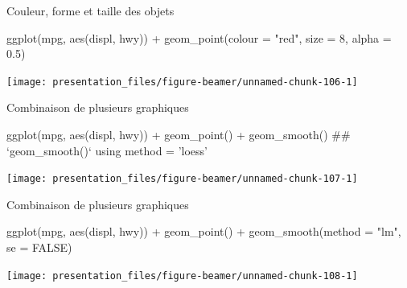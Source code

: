 \documentclass[12pt,handout,ignorenonframetext,]{beamer}
\newenvironment{Shaded}{}{}
\newcommand{\KeywordTok}[1]{\textcolor[rgb]{0.00,0.00,1.00}{#1}}
\newcommand{\DataTypeTok}[1]{#1}
\newcommand{\DecValTok}[1]{#1}
\newcommand{\FloatTok}[1]{#1}
\newcommand{\StringTok}[1]{\textcolor[rgb]{0.00,0.50,0.50}{#1}}
\newcommand{\OtherTok}[1]{\textcolor[rgb]{1.00,0.25,0.00}{#1}}
\newcommand{\OperatorTok}[1]{#1}
\newcommand{\NormalTok}[1]{#1}
\renewenvironment{Shaded}{\begin{snugshade}}{\end{snugshade}}
\begin{document}
\begin{frame}[fragile]{Couleur, forme et taille des objets}

\footnotesize \center

\begin{Shaded}
\begin{Highlighting}[]
\KeywordTok{ggplot}\NormalTok{(mpg, }\KeywordTok{aes}\NormalTok{(displ, hwy)) }\OperatorTok{+}
\StringTok{  }\KeywordTok{geom_point}\NormalTok{(}\DataTypeTok{colour =} \StringTok{"red"}\NormalTok{, }\DataTypeTok{size =} \DecValTok{8}\NormalTok{, }\DataTypeTok{alpha =} \FloatTok{0.5}\NormalTok{)}
\end{Highlighting}
\end{Shaded}

\texttt{[image: presentation\_files/figure-beamer/unnamed-chunk-106-1]}

\end{frame}

\begin{frame}[fragile]{Combinaison de plusieurs graphiques}

\footnotesize \center

\begin{Shaded}
\begin{Highlighting}[]
\KeywordTok{ggplot}\NormalTok{(mpg, }\KeywordTok{aes}\NormalTok{(displ, hwy)) }\OperatorTok{+}
\StringTok{  }\KeywordTok{geom_point}\NormalTok{() }\OperatorTok{+}\StringTok{ }\KeywordTok{geom_smooth}\NormalTok{()}
\NormalTok{  ## `geom_smooth()` using method = 'loess'}
\end{Highlighting}
\end{Shaded}

\texttt{[image: presentation\_files/figure-beamer/unnamed-chunk-107-1]}

\end{frame}

\begin{frame}[fragile]{Combinaison de plusieurs graphiques}

\footnotesize \center

\begin{Shaded}
\begin{Highlighting}[]
\KeywordTok{ggplot}\NormalTok{(mpg, }\KeywordTok{aes}\NormalTok{(displ, hwy)) }\OperatorTok{+}
\StringTok{  }\KeywordTok{geom_point}\NormalTok{() }\OperatorTok{+}\StringTok{ }\KeywordTok{geom_smooth}\NormalTok{(}\DataTypeTok{method =} \StringTok{"lm"}\NormalTok{, }\DataTypeTok{se =} \OtherTok{FALSE}\NormalTok{)}
\end{Highlighting}
\end{Shaded}

\texttt{[image: presentation\_files/figure-beamer/unnamed-chunk-108-1]}

\end{frame}
\end{document}
